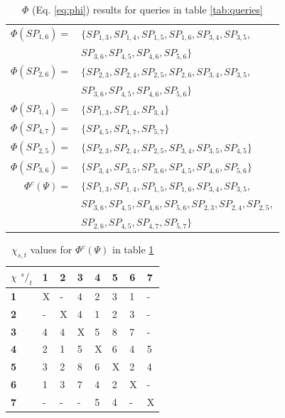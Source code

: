 \begin{table}
\begin{tabular}{r p{}}
$\Phi(SP_{1,6})=$ 	& $\{SP_{1,3},SP_{1,4},SP_{1,5},SP_{1,6},SP_{3,4},SP_{3,5},$\\
		 	& $SP_{3,6},SP_{4,5},SP_{4,6},SP_{5,6}\}$ \\
$\Phi(SP_{2,6})=$ 	& $\{SP_{2,3},SP_{2,4},SP_{2,5},SP_{2,6},SP_{3,4},SP_{3,5},$ \\
			& $SP_{3,6},SP_{4,5},SP_{4,6},SP_{5,6}\}$ \\
$\Phi(SP_{1,4})=$ 	& $\{SP_{1,3},SP_{1,4},SP_{3,4}\}$ \\
$\Phi(SP_{4,7})=$ 	& $\{SP_{4,5},SP_{4,7},SP_{5,7}\}$ \\
$\Phi(SP_{2,5})=$ 	& $\{SP_{2,3},SP_{2,4},SP_{2,5},SP_{3,4},SP_{3,5},SP_{4,5}\}$ \\
$\Phi(SP_{3,6})=$ 	& $\{SP_{3,4},SP_{3,5},SP_{3,6},SP_{4,5},SP_{4,6},SP_{5,6}\}$ \\\hline
$\Phi^c(\Psi) =$ 	& $\{SP_{1,3},SP_{1,4},SP_{1,5},SP_{1,6},SP_{3,4},SP_{3,5},$ \\
			& $SP_{3,6},SP_{4,5},SP_{4,6},SP_{5,6},SP_{2,3},SP_{2,4},SP_{2,5},$ \\
			& $SP_{2,6},SP_{4,5},SP_{4,7},SP_{5,7}\}$  \\
\end{tabular}
\caption{$\Phi$ (Eq. \ref{eq:phi}) results for queries in table \ref{tab:queries}}
\label{tab:chi}
\end{table}

\begin{table}
\center
\begin{tabular}{|l||l|l|l|l|l|l|l|}
\textbf{$\chi$ ${^s/_t}$}& \textbf{1}	& \textbf{2}	& \textbf{3}	& \textbf{4}	& \textbf{5}	& \textbf{6}	& \textbf{7} \\\hline
\textbf{1}	& X	& -	& 4	& 2	& 3	& 1	& -	 \\
\textbf{2}	& -	& X	& 4	& 1	& 2	& 3	& -	 \\
\textbf{3}	& 4	& 4	& X	& 5	& 8	& 7	& -	 \\
\textbf{4}	& 2	& 1	& 5	& X	& 6	& 4	& 5	 \\
\textbf{5}	& 3	& 2	& 8	& 6	& X	& 2	& 4	 \\
\textbf{6}	& 1	& 3	& 7	& 4	& 2	& X	& -	 \\
\textbf{7}	& -	& -	& -	& 5	& 4	& -	& X	 \\
\end{tabular}
\caption{$\chi_{s,t}$ values for $\Phi^c(\Psi)$ in table \ref{tab:chi}}
\label{tab:freq}
\end{table}



